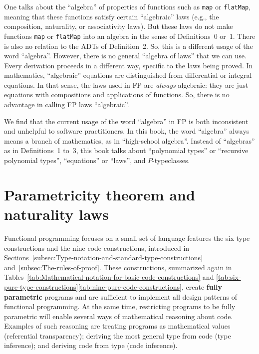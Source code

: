 One talks about the \textquotedblleft algebra\textquotedblright{}
of properties of functions such as \lstinline!map! or \lstinline!flatMap!,
meaning that these functions satisfy certain \textsf{``}algebraic\textsf{''} laws
(e.g., the composition, naturality, or associativity laws). But these
laws do not make functions \lstinline!map! or \lstinline!flatMap!
into an algebra in the sense of Definitions~0 or~1. There is also
no relation to the ADTs of Definition~2. So, this is a different
usage of the word \textsf{``}algebra\textsf{''}. However, there is no general \textsf{``}algebra
of laws\textsf{''} that we can use. Every derivation proceeds in a different
way, specific to the laws being proved. In mathematics, \textsf{``}algebraic\textsf{''}
equations are distinguished from differential or integral equations.
In that sense, the laws used in FP are \emph{always} algebraic: they
are just equations with compositions and applications of functions.
So, there is no advantage in calling FP laws \textsf{``}algebraic\textsf{''}. 

We find that the current usage of the word \textsf{``}algebra\textsf{''} in FP is
both inconsistent and unhelpful to software practitioners. In this
book, the word \textsf{``}algebra\textsf{''} always means a branch of mathematics,
as in \textsf{``}high-school algebra\textsf{''}. Instead of \textsf{``}algebras\textsf{''} as in Definitions~1
to~3, this book talks about \textsf{``}polynomial types\textsf{''} or \textsf{``}recursive
polynomial types\textsf{''}, \textsf{``}equations\textsf{''} or \textsf{``}laws\textsf{''}, and $P$-typeclasses.

\chapter{Parametricity theorem and naturality laws\label{app:Proofs-of-naturality-parametricity}}

Functional programming focuses on a small set of language features
\textemdash{} the six type constructions and the nine code constructions,
introduced in Sections~\ref{subsec:Type-notation-and-standard-type-constructions}
and~\ref{subsec:The-rules-of-proof}. These constructions, summarized
again in Tables~\ref{tab:Mathematical-notation-for-basic-code-constructions}
and \ref{tab:six-pure-type-constructions}\textendash \ref{tab:nine-pure-code-constructions},
create \textbf{fully parametric} programs
and are sufficient to implement all design patterns of functional
programming. At the same time, restricting programs to be fully parametric
will enable several ways of mathematical reasoning about code. Examples
of such reasoning are treating programs as mathematical values (referential
transparency); deriving the most
general type from code (type inference); and
deriving code from type (code inference).

